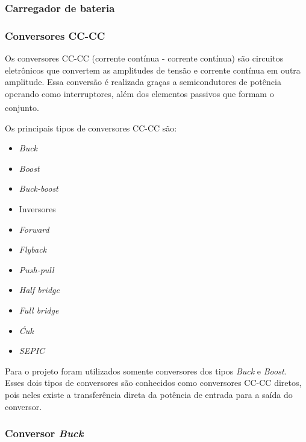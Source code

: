 \documentclass[
	12pt,				%
	openright,			%
	oneside,			%
	a4paper,			%
	english,			%
	french,				%
	spanish,			%
	brazil,				%
	oldfontcommands
	]{abntex2}
\begin{document}
\subsubsection[Carregador de bateria]{Carregador de bateria}

\subsubsection[Conversores CC-CC]{Conversores CC-CC}

	Os conversores CC-CC (corrente contínua - corrente contínua) são circuitos eletrônicos que convertem as amplitudes de tensão e corrente contínua em outra amplitude. Essa conversão é realizada graças a semicondutores de potência operando como interruptores, além dos elementos passivos que formam o conjunto.\textsuperscript{\cite{semicondutores3}}
	
	Os principais tipos de conversores CC-CC são:
	
	\begin{minipage}{7cm}
		\begin{itemize}
			\item	\textit{Buck}
			\item	\textit{Boost}
			\item	\textit{Buck-boost}
			\item	Inversores
			\item	\textit{Forward}
			\item	\textit{Flyback}
	\end{itemize}
	\end{minipage}
	\begin{minipage}{7cm}
		\begin{itemize}
			\item	\textit{Push-pull}
			\item	\textit{Half bridge}
			\item	\textit{Full bridge}
			\item	\textit{Ćuk}
			\item	\textit{SEPIC}
		\end{itemize}
	\end{minipage}

	Para o projeto foram utilizados somente conversores dos tipos \textit{Buck} e \textit{Boost}. Esses dois tipos de conversores são conhecidos como conversores CC-CC diretos, pois neles existe a transferência direta da potência de entrada para a saída do conversor.
	
\subsubsection[Conversor Buck]{Conversor \textit{Buck}}
\end{document}
